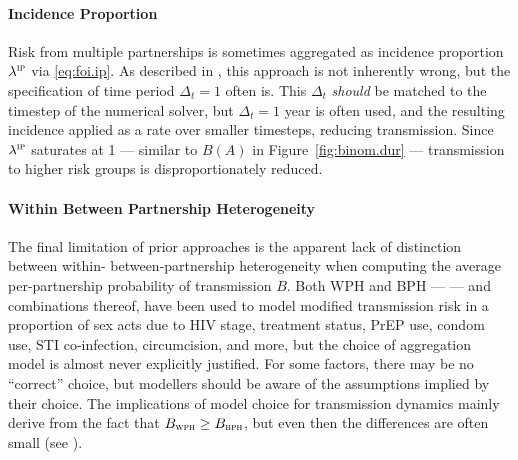 \paragraph{Incidence Proportion}
Risk from multiple partnerships is sometimes aggregated as
incidence proportion $\lambda^\textsc{ip}$ via \eqref{eq:foi.ip}.
As described in , this approach is not inherently wrong,
but the specification of time period $\Delta_t = 1$ often is.
This $\Delta_t$ \emph{should} be matched to the timestep of the numerical solver,
but $\Delta_t = 1$ year is often used,
and the resulting incidence applied as a rate over smaller timesteps, reducing transmission.
Since $\lambda^\textsc{ip}$ saturates at 1 --- similar to $B(A)$ in Figure~\ref{fig:binom.dur} ---
transmission to higher risk groups is disproportionately reduced.
\paragraph{Within \vs Between Partnership Heterogeneity}
The final limitation of prior approaches is the apparent lack of distinction between
within- \vs between-partnership heterogeneity when computing
the average per-partnership probability of transmission $B$.
Both WPH and BPH --- \ie {} --- and combinations thereof, have been used
to model modified transmission risk in a proportion of sex acts due to
HIV stage, treatment status, PrEP use, condom use, STI co-infection, circumcision, and more,
but the choice of aggregation model is almost never explicitly justified.
For some factors, there may be no ``correct'' choice,
but modellers should be aware of the assumptions implied by their choice.
The implications of model choice for transmission dynamics
mainly derive from the fact that $B_{\textsc{wph}} \ge B_{\textsc{bph}}$,
but even then the differences are often small (see ).
